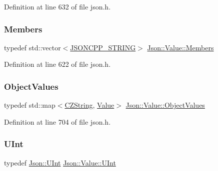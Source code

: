 Definition at line 632 of file json.\+h.

\mbox{\label{class_json_1_1_value_a9ae9069983fc38f1928d76f9c79ac64d}} 
\subsubsection{\texorpdfstring{Members}{Members}}
{\footnotesize\ttfamily typedef std\+::vector$<$\hyperlink{json_8h_a1e723f95759de062585bc4a8fd3fa4be}{J\+S\+O\+N\+C\+P\+P\+\_\+\+S\+T\+R\+I\+NG}$>$ \hyperlink{class_json_1_1_value_a9ae9069983fc38f1928d76f9c79ac64d}{Json\+::\+Value\+::\+Members}}



Definition at line 622 of file json.\+h.

\mbox{\label{class_json_1_1_value_a08b6c80c3af7071d908dabf044de5388}} 
\subsubsection{\texorpdfstring{Object\+Values}{ObjectValues}}
{\footnotesize\ttfamily typedef std\+::map$<$\hyperlink{class_json_1_1_value_1_1_c_z_string}{C\+Z\+String}, \hyperlink{class_json_1_1_value}{Value}$>$ \hyperlink{class_json_1_1_value_a08b6c80c3af7071d908dabf044de5388}{Json\+::\+Value\+::\+Object\+Values}}



Definition at line 704 of file json.\+h.

\mbox{\label{class_json_1_1_value_a0933d59b45793ae4aade1757c322a98d}} 
\subsubsection{\texorpdfstring{U\+Int}{UInt}}
{\footnotesize\ttfamily typedef \hyperlink{namespace_json_a800fb90eb6ee8d5d62b600c06f87f7d4}{Json\+::\+U\+Int} \hyperlink{class_json_1_1_value_a0933d59b45793ae4aade1757c322a98d}{Json\+::\+Value\+::\+U\+Int}}



